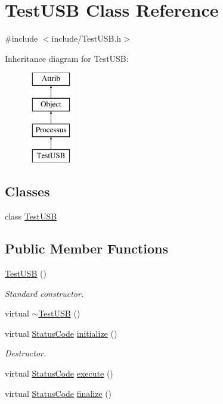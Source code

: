 \hypertarget{classTestUSB}{}\section{Test\+U\+SB Class Reference}
\label{classTestUSB}


{\ttfamily \#include $<$include/\+Test\+U\+S\+B.\+h$>$}

Inheritance diagram for Test\+U\+SB\+:\begin{figure}[H]
\begin{center}
\leavevmode
\includegraphics[height=4.000000cm]{classTestUSB}
\end{center}
\end{figure}
\subsection*{Classes}
\begin{DoxyCompactItemize}
\item 
class \hyperlink{classTestUSB_1_1TestUSB}{Test\+U\+SB}
\end{DoxyCompactItemize}
\subsection*{Public Member Functions}
\begin{DoxyCompactItemize}
\item 
\hyperlink{classTestUSB_a4aae5a332f7484f9ef05296b638975c1}{Test\+U\+SB} ()
\begin{DoxyCompactList}\small\item\em Standard constructor. \end{DoxyCompactList}\item 
virtual \hyperlink{classTestUSB_aaf3f78695bc950b0bd49c2d60494cd44}{$\sim$\+Test\+U\+SB} ()
\item 
virtual \hyperlink{classStatusCode}{Status\+Code} \hyperlink{classTestUSB_ae7cca13f49e4180c93f9f5a3cbd05985}{initialize} ()
\begin{DoxyCompactList}\small\item\em Destructor. \end{DoxyCompactList}\item 
virtual \hyperlink{classStatusCode}{Status\+Code} \hyperlink{classTestUSB_a8c3d68e00ec4f10ec638969756a925a8}{execute} ()
\item 
virtual \hyperlink{classStatusCode}{Status\+Code} \hyperlink{classTestUSB_a24bb22d7203746e6c3b5669aa71e72f3}{finalize} ()
\end{DoxyCompactItemize}
